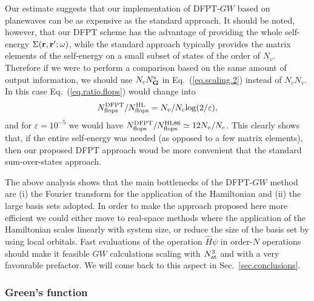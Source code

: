 \documentclass[twocolumn,prb,showpacs,superscriptaddress]{revtex4}
\def\w{\omega}
\def\G{{\bf G}}
\def\r{{\bf r}}
\def\rp{{\bf r^\prime}}
\begin{document}
Our estimate suggests that our implementation of DFPT-$GW$ 
based on planewaves can be as expensive as the standard approach.
It should be noted, however, that our DFPT scheme has the advantage of providing
the whole self-energy $\Sigma(\r,\rp;\w)$, while the standard approach 
typically provides the matrix elements of the self-energy on a small subset of states of the order of $N_v$. 
Therefore if we were to perform a comparison based on the
same amount of output information, we should use $N_c N_\G^{\rm s}$ in Eq.\ (\ref{eq.scaling.2})
instead of $N_c N_v$. In this case Eq.\ (\ref{eq.ratio.flops}) would change into
  \begin{equation}
  N^{\rm DFPT}_{\rm flops}/N^{\rm HL}_{\rm flops} = N_v /N_c{\rm log}(2/\varepsilon),
  \end{equation}
and for $\varepsilon=10^{-5}$ we would have $N^{\rm DFPT}_{\rm flops}/N^{\rm HL86}_{\rm flops}\simeq 12 N_v/N_c$.
This clearly shows that, if the entire self-energy was needed (as opposed to a few matrix elements),
then our proposed DFPT approach woud be more convenient that the standard sum-over-states
approach.

The above analysis shows that the main bottlenecks of the DFPT-$GW$ method 
are (i) the Fourier transform for the application of the Hamiltonian and (ii) the large basis sets adopted.
In order to make the approach proposed here more efficient we could either
move to real-space methods where the application of the Hamiltonian scales linearly with system size,\cite{chelikowsky}
or reduce the size of the basis set by using local orbitals.\cite{siesta} 
Fast evaluations of the operation $\hat{H}\psi$ in order-$N$ operations should 
make it feasible $GW$ calculations scaling with $N_{\rm at}^3$ and with a very favourable
prefactor. We will come back to this aspect in Sec.\ \ref{sec.conclusions}.

\subsubsection{Green's function}\label{sec.green.scaling}
\end{document}
